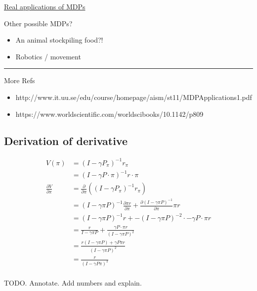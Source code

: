 \href{http://www.it.uu.se/edu/course/homepage/aism/st11/MDPApplications1.pdf}{Real
applications of MDPs}

Other possible MDPs?

\begin{itemize}
\tightlist
\item
  An animal stockpiling food?!
\item
  Robotics / movement
\end{itemize}

\begin{center}\rule{0.5\linewidth}{\linethickness}\end{center}

More Refs

\begin{itemize}
\tightlist
\item
  http://www.it.uu.se/edu/course/homepage/aism/st11/MDPApplications1.pdf
\item
  https://www.worldscientific.com/worldscibooks/10.1142/p809
\end{itemize}




\subsection{Derivation of derivative}

\begin{align}
V(\pi) &= (I − \gamma P_{\pi})^{−1}r_{\pi} \\
&= (I − \gamma P\cdot \pi)^{−1}r\cdot \pi \\
\frac{\partial V}{\partial \pi} &= \frac{\partial}{\partial \pi}((I-\gamma P_{\pi})^{-1} r_{\pi}) \\
&= (I-\gamma \pi P)^{-1} \frac{\partial \pi r}{\partial \pi}+   \frac{\partial (I-\gamma \pi P)^{-1}}{\partial \pi}\pi r\tag{product rule} \\
&= (I-\gamma \pi P)^{-1} r + -(I-\gamma \pi P)^{-2} \cdot -\gamma P\cdot \pi r\\
&= \frac{r}{I-\gamma \pi P} + \frac{ \gamma P\cdot \pi r}{(I-\gamma \pi P)^2}\\
&= \frac{r(I-\gamma \pi P) + \gamma P \pi r}{(I-\gamma \pi P)^2} \\
& = \frac{r}{(I-\gamma P \pi)^2} \\
\end{align}

TODO. Annotate. Add numbers and explain.
